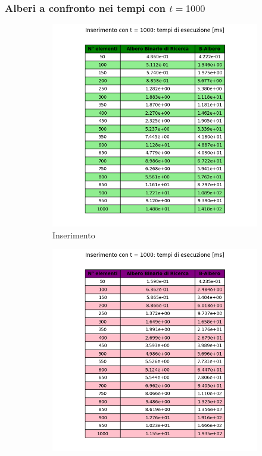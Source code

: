 \subsubsection{Alberi a confronto nei tempi con $t = 1000$}

\begin{figure}[H]
    \centering
    \begin{subfigure}[b]{0.49\textwidth}
        \centering
        \includegraphics[width=\textwidth]{tables/insert-ms-t1000.png}
        \caption{Inserimento}
        \label{fig:tableinserttimet1000}
    \end{subfigure}
    \hfill
    \begin{subfigure}[b]{0.49\textwidth}
        \centering
        \includegraphics[width=\textwidth]{tables/search-ms-t1000.png}

\end{subfigure}
\end{figure}
